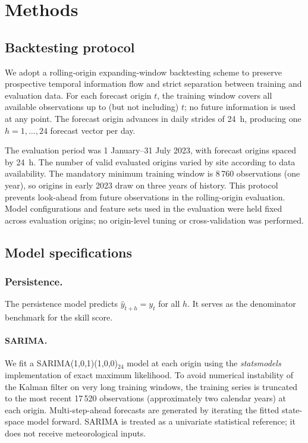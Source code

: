 \documentclass[pdflatex,sn-basic,iicol]{sn-jnl}
\begin{document}
\section{Methods}
\label{sec:methods}

\subsection{Backtesting protocol}

We adopt a rolling-origin expanding-window backtesting scheme to preserve
prospective temporal information flow and strict separation between training
and evaluation data.  For each forecast origin $t$, the training window covers
all available observations up to (but not including) $t$; no future information
is used at any point.  The forecast origin advances in daily strides of 24~h,
producing one $h = 1, \ldots, 24$ forecast vector per day.

The evaluation period was 1 January--31 July 2023, with forecast origins spaced
by 24~h.  The number of valid evaluated origins varied by site according to data
availability.
The mandatory minimum training window is 8\,760 observations (one year), so
origins in early 2023 draw on three years of history.  This protocol prevents
look-ahead from future observations in the rolling-origin evaluation.  Model configurations and feature sets used in the
evaluation were held fixed across evaluation origins; no origin-level tuning or
cross-validation was performed.

\subsection{Model specifications}

\subsubsection{Persistence.}
The persistence model predicts $\hat{y}_{t+h} = y_t$ for all $h$.  It serves
as the denominator benchmark for the skill score.

\paragraph{SARIMA.}
We fit a SARIMA(1,0,1)(1,0,0)$_{24}$ model at each origin using the
\textit{statsmodels} implementation of exact maximum likelihood.  To avoid
numerical instability of the Kalman filter on very long training windows, the
training series is truncated to the most recent 17\,520 observations
(approximately two calendar years) at each origin.  Multi-step-ahead forecasts
are generated by iterating the fitted state-space model forward.  SARIMA is
treated as a univariate statistical reference; it does not receive
meteorological inputs.
\end{document}
